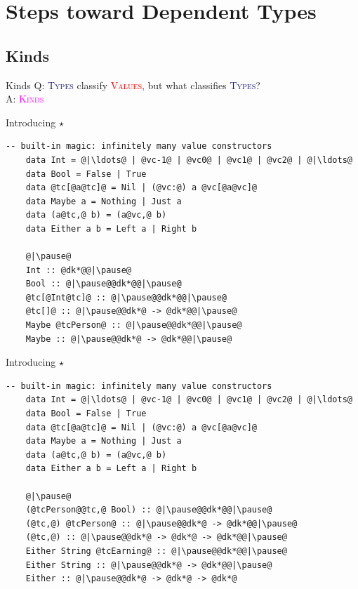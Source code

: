\documentclass[xcolor={usenames,dvipsnames}]{beamer}
\newcommand{\htycon}[1]{\textcolor{MidnightBlue}{\textsc{#1}}}
\newcommand{\hvalcon}[1]{\textcolor{Red}{\textsc{#1}}}
\newcommand{\hkind}[1]{\textcolor{Fuchsia}{\textsc{#1}}}
\begin{document}
\section{Steps toward Dependent Types}

\subsection{Kinds}

\begin{frame}[fragile]{Kinds}
  Q: \htycon{Types} classify \hvalcon{Values}, but what classifies \htycon{Types}?\\
  A: \hkind{Kinds}
\end{frame}

\begin{frame}[fragile]{Introducing $\star$}
  \begin{lstlisting}[style=hask]
    -- built-in magic: infinitely many value constructors
    data Int = @|\ldots@ | @vc-1@ | @vc0@ | @vc1@ | @vc2@ | @|\ldots@
    data Bool = False | True
    data @tc[@a@tc]@ = Nil | (@vc:@) a @vc[@a@vc]@
    data Maybe a = Nothing | Just a
    data (a@tc,@ b) = (a@vc,@ b)
    data Either a b = Left a | Right b

    @|\pause@
    Int :: @dk*@@|\pause@
    Bool :: @|\pause@@dk*@@|\pause@
    @tc[@Int@tc]@ :: @|\pause@@dk*@@|\pause@
    @tc[]@ :: @|\pause@@dk*@ -> @dk*@@|\pause@
    Maybe @tcPerson@ :: @|\pause@@dk*@@|\pause@
    Maybe :: @|\pause@@dk*@ -> @dk*@@|\pause@
  \end{lstlisting}
\end{frame}

\begin{frame}[fragile]{Introducing $\star$}
  \begin{lstlisting}[style=hask]
    -- built-in magic: infinitely many value constructors
    data Int = @|\ldots@ | @vc-1@ | @vc0@ | @vc1@ | @vc2@ | @|\ldots@
    data Bool = False | True
    data @tc[@a@tc]@ = Nil | (@vc:@) a @vc[@a@vc]@
    data Maybe a = Nothing | Just a
    data (a@tc,@ b) = (a@vc,@ b)
    data Either a b = Left a | Right b

    @|\pause@
    (@tcPerson@@tc,@ Bool) :: @|\pause@@dk*@@|\pause@
    (@tc,@) @tcPerson@ :: @|\pause@@dk*@ -> @dk*@@|\pause@
    (@tc,@) :: @|\pause@@dk*@ -> @dk*@ -> @dk*@@|\pause@
    Either String @tcEarning@ :: @|\pause@@dk*@@|\pause@
    Either String :: @|\pause@@dk*@ -> @dk*@@|\pause@
    Either :: @|\pause@@dk*@ -> @dk*@ -> @dk*@
  \end{lstlisting}
\end{frame}
\end{document}
